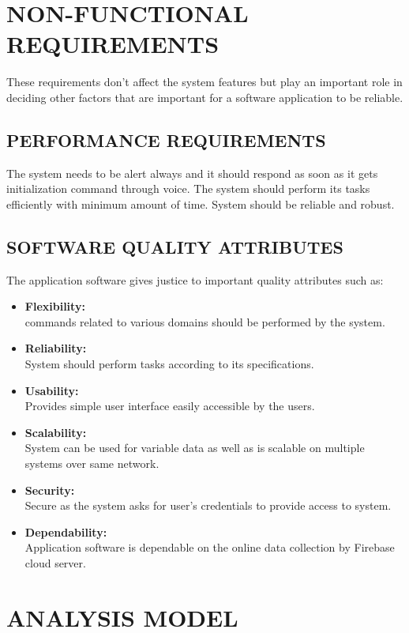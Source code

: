 \documentclass[12pt]{extreport}
\begin{document}
\section{NON-FUNCTIONAL REQUIREMENTS}
\hspace*{3em}These requirements don't affect the system features but play an important role in deciding other factors that are important for a software application to be reliable.
     \subsection{PERFORMANCE REQUIREMENTS}
\hspace*{3em}The system needs to be alert always and it should respond as soon as it gets initialization command through voice. The system should perform its tasks efficiently with minimum amount of time. System should be reliable and robust.

     \subsection{SOFTWARE QUALITY ATTRIBUTES}
The application software gives justice to important quality attributes such as:
\begin{itemize}
\item \textbf{Flexibility:}\\ commands related to various domains should be performed by the system.
\item \textbf{Reliability:}\\ System should perform tasks according to its specifications.
\item \textbf{Usability:}\\Provides simple user interface easily accessible by the users.
\item \textbf{Scalability:}\\System can be used for variable data as well as is scalable on multiple systems over same network.
\item \textbf{Security:}\\Secure as the system asks for user's credentials to provide access to system.
\item \textbf{Dependability:}\\Application software is dependable on the online data collection by Firebase cloud server.
\end{itemize}     

\section{ANALYSIS MODEL}
\end{document}
